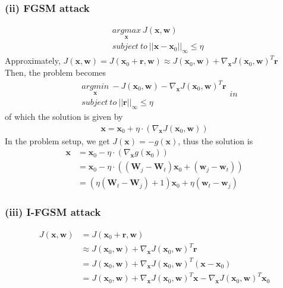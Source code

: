 \documentclass[11pt]{article}
\begin{document}
\subsubsection*{(ii) FGSM attack}
\begin{equation}
\begin{split}
&\underset{\pmb{x}}{argmax}\ J(\pmb{x},\pmb{w})\\
&subject\ to\ ||\pmb{x}-\pmb{x}_0||_\infty\le\eta
\end{split}
\end{equation}
Approximately, $J(\pmb{x},\pmb{w}) = J(\pmb{x}_0+\pmb{r},\pmb{w})\approx J(\pmb{x}_0, \pmb{w})+\nabla_{\pmb{x}}J(\pmb{x}_0,\pmb{w})^T\pmb{r}$\\
Then, the problem becomes
\begin{equation}
\begin{split}
&\underset{\pmb{x}}{argmin}\ -J(\pmb{x}_0, \pmb{w})-\nabla_{\pmb{x}}J(\pmb{x}_0,\pmb{w})^T\pmb{r}\\
&subject\ to\ ||\pmb{r}||_\infty\le\eta
\end{split}in
\end{equation}
of which the solution is given by
\begin{equation}
\begin{split}
\pmb{x} = \pmb{x}_0+\eta\cdot(\nabla_{\pmb{x}}J(\pmb{x}_0,\pmb{w}))
\end{split}
\end{equation}
In the problem setup, we get $J(\pmb{x})= -g(\pmb{x})$, thus the solution is 
\begin{equation}
\begin{split}
\pmb{x} &= \pmb{x}_0-\eta\cdot(\nabla_{\pmb{x}}g(\pmb{x}_0))\\
&= \pmb{x}_0-\eta\cdot((\pmb{W}_j-\pmb{W}_t)\pmb{x}_0+(\pmb{w}_j-\pmb{w}_t))\\
&= (\eta(\pmb{W}_t-\pmb{W}_j)+1)\pmb{x}_0+\eta(\pmb{w}_t-\pmb{w}_j)
\end{split}
\end{equation}
\subsubsection*{(iii) I-FGSM attack}

\begin{equation}
\begin{split}
J(\pmb{x},\pmb{w})&=J(\pmb{x}_0+\pmb{r},\pmb{w})\\
&\approx J(\pmb{x}_0,\pmb{w})+\nabla_{\pmb{x}}J(\pmb{x}_0,\pmb{w})^T\pmb{r}\\
&= J(\pmb{x}_0,\pmb{w})+\nabla_{\pmb{x}}J(\pmb{x}_0,\pmb{w})^T(\pmb{x}-\pmb{x}_0)\\
&= J(\pmb{x}_0,\pmb{w})+\nabla_{\pmb{x}}J(\pmb{x}_0,\pmb{w})^T\pmb{x}-\nabla_{\pmb{x}}J(\pmb{x}_0,\pmb{w})^T\pmb{x}_0\\
\end{split}
\end{equation}
\end{document}
